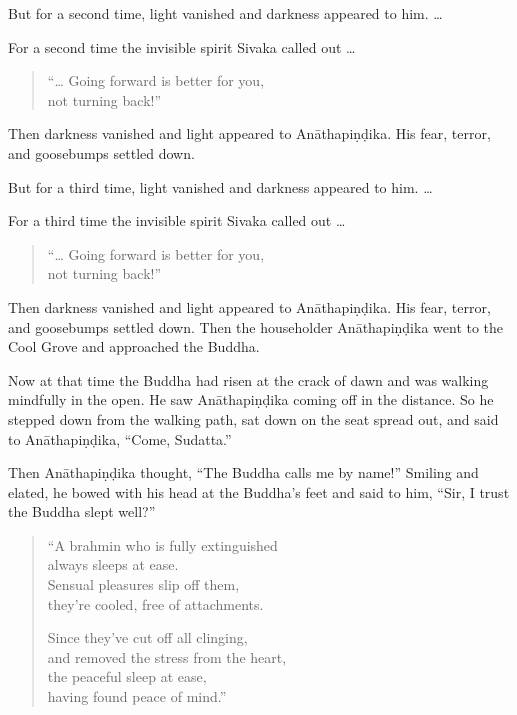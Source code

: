 \documentclass[12pt,openany]{book}%
\begin{document}
But for a second time, light vanished and darkness appeared to him. … 

For a second time the invisible spirit Sivaka called out … 

\begin{verse}%
“… Going forward is better for you, \\
not turning back!” 

%
\end{verse}

Then darkness vanished and light appeared to \textsanskrit{Anāthapiṇḍika}. His fear, terror, and goosebumps settled down. 

But for a third time, light vanished and darkness appeared to him. … 

For a third time the invisible spirit Sivaka called out … 

\begin{verse}%
“… Going forward is better for you, \\
not turning back!” 

%
\end{verse}

Then darkness vanished and light appeared to \textsanskrit{Anāthapiṇḍika}. His fear, terror, and goosebumps settled down. Then the householder \textsanskrit{Anāthapiṇḍika} went to the Cool Grove and approached the Buddha. 

Now at that time the Buddha had risen at the crack of dawn and was walking mindfully in the open. He saw \textsanskrit{Anāthapiṇḍika} coming off in the distance. So he stepped down from the walking path, sat down on the seat spread out, and said to \textsanskrit{Anāthapiṇḍika}, “Come, Sudatta.” 

Then \textsanskrit{Anāthapiṇḍika} thought, “The Buddha calls me by name!” Smiling and elated, he bowed with his head at the Buddha’s feet and said to him, “Sir, I trust the Buddha slept well?” 

\begin{verse}%
“A brahmin who is fully extinguished \\
always sleeps at ease. \\
Sensual pleasures slip off them, \\
they’re cooled, free of attachments. 

Since they’ve cut off all clinging, \\
and removed the stress from the heart, \\
the peaceful sleep at ease, \\
having found peace of mind.” 

%
\end{verse}
\end{document}
